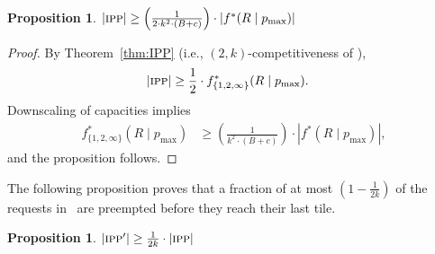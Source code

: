 \documentclass[11pt]{article}
\newtheorem{proposition}[theorem]{Proposition}
\newcommand{\route}{\text{\sc{ipp}}}
\newcommand{\IPP}{\route}
\newcommand{\pmax}{p_{\max}}
\newenvironment{proof sketch}[1]{\noindent {\emph{Proof sketch of #1:}}}{\hfill \qed}
\begin{document}
\begin{proposition}\label{prop:fipp}
    $|\IPP| \geq \left(\frac{1}{2\cdot k^{2}\cdot(B+c)}\right) \cdot |f^*(R\mid \pmax)|$
\end{proposition}
\begin{proof}
By    Theorem~\ref{thm:IPP} (i.e., $(2,k)$-competitiveness of \IPP),
\begin{align*}
  |\IPP| &\geq \frac {1}{2} \cdot f^*_{\{1,2,\infty\}} (R \mid \pmax ).
\end{align*}
Downscaling of capacities implies
\begin{align*}
f^*_{\{1,2,\infty\}}(R \mid \pmax)
  &\geq \left(\frac{1}{k^{2}\cdot(B+c)}\right) \cdot |f^*(R\mid \pmax)|,
\end{align*}
and the proposition follows.
\end{proof}


The following proposition proves that a fraction of at most $(1-\frac{1}{2k})$ of the
requests in \IPP\ are preempted before they reach their last tile.
\begin{proposition}\label{prop:preemptions}
    $|\IPP'| \geq \frac{1}{2k} \cdot |\IPP|$
\end{proposition}
\end{document}
